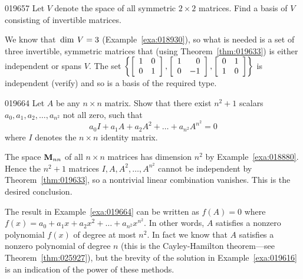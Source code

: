 \begin{example}{}{019657}
Let $V$ denote the space of all symmetric $2 \times 2$ matrices. Find a basis of $V$ consisting of invertible matrices.

\begin{solution}
We know that $\thinspace\operatorname{dim\medspace} V = 3$ (Example~\ref{exa:018930}), so what is needed is a set of three invertible, symmetric matrices that (using Theorem~\ref{thm:019633}) is either independent or spans $V$. The set 
$\left\{
\left[ \begin{array}{rr}
1 & 0 \\
0 & 1
\end{array} \right], \left[ \begin{array}{rr}
1 & 0 \\
0 & -1
\end{array} \right], \left[ \begin{array}{rr}
0 & 1 \\
1 & 0
\end{array} \right]
\right\}$ is independent (verify) and so is a basis of the required type.
\end{solution}
\end{example}

\begin{example}{}{019664}
Let $A$ be any $n \times n$ matrix. Show that there exist $n^{2} + 1$ scalars $a_{0}, a_{1}, a_{2}, \dots, a_{n^{2}}$ not all zero, such that
\begin{equation*}
a_0I + a_1A +a_2A^2 + \dots + a_{n^2}A^{n^2} = 0
\end{equation*}
where $I$ denotes the $n \times n$ identity matrix.

\begin{solution}
The space $\textbf{M}_{nn}$ of all $n \times n$ matrices has dimension $n^{2}$ by Example~\ref{exa:018880}. Hence the $n^{2} + 1$ matrices $I, A, A^{2}, \dots, A^{n^{2}}$ cannot be independent by Theorem~\ref{thm:019633}, so a nontrivial linear combination vanishes. This is the desired conclusion.
\end{solution}
\end{example}

\noindent The result in Example~\ref{exa:019664} can be written as $f(A) = 0$ where $f(x) = a_{0} + a_{1}x + a_{2}x^{2} + \dots + a_{n^{2}}x^{n^{2}}$. In other words, $A$ satisfies a nonzero polynomial $f(x)$ of degree at most $n^{2}$. In fact we know that $A$ satisfies a nonzero polynomial of degree $n$ (this is the Cayley-Hamilton theorem---see Theorem~\ref{thm:025927}), but the brevity of the solution in Example~\ref{exa:019616} is an indication of the power of these methods.

